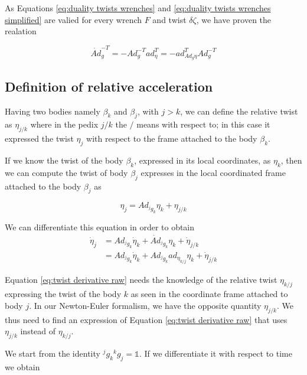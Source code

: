 \documentclass[12pt,a4paper]{book}
\begin{document}
As Equations \eqref{eq:duality twists wrenches} and \eqref{eq:duality twists wrenches simplified} are valied for every wrench $F$ and twist $\delta \zeta$, we have proven the realation

\begin{equation}
	\dot{Ad}_g^{-T} = - Ad_g^{-T} ad_\eta ^T = - ad^T _{Ad_g \eta} Ad_g ^{-T}
\end{equation}


\subsection{Definition of relative acceleration}

Having two bodies namely $\beta_k$ and $\beta_j$, with $j>k$, we can define the relative twist as $\eta_{j/k}$ where in the pedix $j/k$ the $/$ means with respect to; in this case it expressed the twist $\eta_j$ with respect to the frame attached to the body $\beta_k$.

If we know the twist of the body $\beta_k$, expressed in its local coordinates, as $\eta_k$, then we can compute the twist of body $\beta_j$ expresses in the local coordinated frame attached to the body $\beta_j$ as 

\begin{equation}\label{eq: twist definition}
	\eta_j = Ad_{^j g_k} \eta_k + \eta_{j/k}
\end{equation}

We can differentiate this equation in order to obtain 
\begin{equation}\label{eq:twist derivative raw}
\begin{aligned}
	\dot{\eta}_j 	&= Ad_{^jg_k} \dot{\eta}_k + \dot{Ad}_{^jg_k} \eta_k + \dot{\eta}_{j/k} \\
					&= Ad_{^jg_k} \dot{\eta}_k + Ad_{^jg_k} ad_{\eta_{k/j}} \eta_k + \dot{\eta}_{j/k} 
\end{aligned}
\end{equation}

Equation \eqref{eq:twist derivative raw} needs the knowledge of the relative twist $\eta_{k/j}$ expressing the twist of the body $k$ as seen in the coordinate frame attached to body $j$. In our Newton-Euler formalism, we have the opposite quantity $\eta_{j/k}$. We thus need to find an expression of Equation \eqref{eq:twist derivative raw} that uses $\eta_{j/k}$ instead of $\eta_{k/j}$.


We start from the identity ${^jg_k}{^kg_j} = \mathbb{1}$. If we differentiate it with respect to time we obtain 
\end{document}
